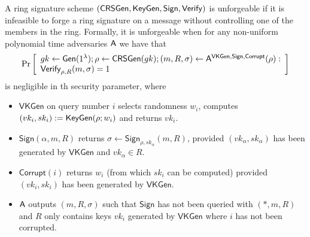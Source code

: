 \begin{definition}
A ring signature scheme $(\mathsf{CRSGen}, \mathsf{KeyGen}, \mathsf{Sign}, \mathsf{Verify})$
is unforgeable if it is infeasible to forge a ring
signature on a message without controlling one of the members in the ring. Formally, it
is unforgeable when for any non-uniform polynomial
time adversaries $\mathsf{A}$ we have that
$$
\Pr\left[\begin{array}{l}
gk\gets\mathsf{Gen}(1^\lambda);\rho\gets\mathsf{CRSGen}(gk);(m,R,\sigma)\gets\mathsf{A}^{\mathsf{VKGen},\mathsf{Sign},\mathsf{Corrupt}}(\rho):\\
\mathsf{Verify}_{\rho,R}(m,\sigma)=1
\end{array}\right]
$$
is negligible in th security parameter, where

\begin{itemize}
\item $\mathsf{VKGen}$ on query number $i$ selects randomness $w_i$, computes $(vk_i,sk_i):= \mathsf{KeyGen}(\rho; w_i)$
and returns $vk_i$.
\item $\mathsf{Sign}(\alpha, m, R)$ returns $\sigma \gets \mathsf{Sign}_{\rho,sk_\alpha}(m, R)$, provided $(vk_\alpha, sk_\alpha)$ has been generated
by $\mathsf{VKGen}$ and $vk_\alpha\in R$.
\item $\mathsf{Corrupt}(i)$ returns $w_i$ (from which $sk_i$ can be computed) provided $(vk_i, sk_i)$ has
been generated by $\mathsf{VKGen}$.
\item $\mathsf{A}$ outputs $(m, R, \sigma)$ such that $\mathsf{Sign}$ has not been queried with $(*, m, R)$ and $R$
only contains keys $vk_i$ generated by $\mathsf{VKGen}$ where $i$ has not been corrupted.
\end{itemize}
\end{definition}

